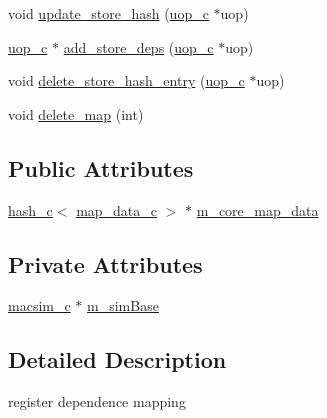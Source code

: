 \begin{DoxyCompactItemize}
\item 
void \hyperlink{classmap__c_a705da8acf7e3d36776e12e83b3dab0f6}{update\_\-store\_\-hash} (\hyperlink{classuop__c}{uop\_\-c} $\ast$uop)
\item 
\hyperlink{classuop__c}{uop\_\-c} $\ast$ \hyperlink{classmap__c_a313f6a7f163ae4b749274d66a0b570a6}{add\_\-store\_\-deps} (\hyperlink{classuop__c}{uop\_\-c} $\ast$uop)
\item 
void \hyperlink{classmap__c_a44553352d9550ac88fb9159be1f6c8c6}{delete\_\-store\_\-hash\_\-entry} (\hyperlink{classuop__c}{uop\_\-c} $\ast$uop)
\item 
void \hyperlink{classmap__c_ac64891f7ad08cd54f76f7069df0df816}{delete\_\-map} (int)
\end{DoxyCompactItemize}
\subsection*{Public Attributes}
\begin{DoxyCompactItemize}
\item 
\hyperlink{classhash__c}{hash\_\-c}$<$ \hyperlink{classmap__data__c}{map\_\-data\_\-c} $>$ $\ast$ \hyperlink{classmap__c_af14fbb514a865af51d89f827d72d17f3}{m\_\-core\_\-map\_\-data}
\end{DoxyCompactItemize}
\subsection*{Private Attributes}
\begin{DoxyCompactItemize}
\item 
\hyperlink{classmacsim__c}{macsim\_\-c} $\ast$ \hyperlink{classmap__c_ad004224b761c096deeeaca078b2ba22d}{m\_\-simBase}
\end{DoxyCompactItemize}


\subsection{Detailed Description}
register dependence mapping 

